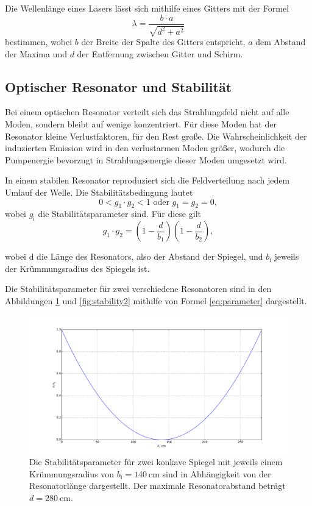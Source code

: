 Die Wellenlänge eines Lasers lässt sich mithilfe eines Gitters mit der Formel 
\begin{equation}
    \lambda = \frac{b \cdot a}{\sqrt{d^2 + a^2}}
    \label{eq:welle}
\end{equation}
bestimmen, wobei $b$ der Breite der Spalte des Gitters entspricht, $a$ dem Abstand der Maxima und $d$ der Entfernung zwischen Gitter und Schirm.

\subsection{Optischer Resonator und Stabilität}
Bei einem optischen Resonator verteilt sich das Strahlungsfeld nicht auf alle Moden, sondern bleibt auf wenige konzentriert. Für diese Moden hat der Resonator kleine Verlustfaktoren, für den Rest große. Die Wahrscheinlichkeit der induzierten Emission wird in den verlustarmen Moden größer, wodurch die Pumpenergie bevorzugt in Strahlungsenergie dieser Moden umgesetzt wird.

In einem stabilen Resonator reproduziert sich die Feldverteilung nach jedem Umlauf der Welle.
Die Stabilitätsbedingung lautet
\begin{equation}
    0 < g_1 \cdot g_2 < 1 \text{ oder } g_1 = g_2 = 0,
    \label{eq:stabilitaet}
\end{equation}
wobei $g_\text{i}$ die Stabilitätsparameter sind.
Für diese gilt
\begin{equation}
    g_1 \cdot g_2 = \left(1-\frac{d}{b_1} \right)\left(1-\frac{d}{b_2} \right),
    \label{eq:parameter}
\end{equation}

wobei d die Länge des Resonators, also der Abstand der Spiegel, und $b_\text{i}$ jeweils der Krümmungsradius des Spiegels ist.

Die Stabilitätsparameter für zwei verschiedene Resonatoren sind in den Abbildungen \ref{fig:stability1} und \ref{fig:stability2} mithilfe von Formel \ref{eq:parameter} dargestellt.

\begin{figure}
    \centering
    \includegraphics[width=15cm]{plots/stability1.pdf}
    \caption{Die Stabilitätsparameter für zwei konkave Spiegel mit jeweils einem Krümmungsradius von $b_\text{i} = \SI{140}{\centi\meter}$ sind in Abhängigkeit von der Resonatorlänge dargestellt. Der maximale Resonatorabstand beträgt $d = \SI{280}{\centi\meter}$.}
    \label{fig:stability1}
\end{figure}


